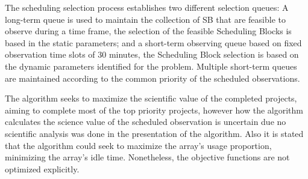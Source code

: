 The scheduling selection process establishes two different selection queues: A long-term queue is used to maintain the collection of SB that are feasible to observe during a time frame, the selection of the feasible Scheduling Blocks is based in the static parameters; and a short-term observing queue based on fixed observation time slots of 30 minutes, the Scheduling Block selection is based on the dynamic parameters identified for the problem. Multiple short-term queues are maintained according to the common priority of the scheduled observations.

The algorithm seeks to maximize the scientific value of the completed projects, aiming to complete most of the top priority projects, however how the algorithm calculates the science value of the scheduled observation is uncertain due no scientific analysis was done in the presentation of the algorithm. Also it is stated that the algorithm could seek to maximize the array's usage proportion, minimizing the array's idle time. Nonetheless, the objective functions are not optimized explicitly.